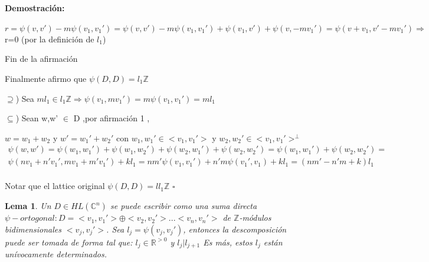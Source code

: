 \documentclass[12pt]{article}
\newtheorem{lemma}{Lema}
\newenvironment{proof}{\paragraph{Demostración:}}{\hfill$\square$}
\begin{document}
\begin{proof}
 $r= \psi(v,v') - m \psi(v_1,v_1')=\psi(v,v')-m\psi(v_1,v_1')+ \psi (v_1,v')+ \psi(v,-m v_1') 
 = \psi(v+v_1,v'-mv_1') \Rightarrow $ r=0 (por la definición de $l_1$)
 
 Fin de la afirmación
 \newline
 
 Finalmente afirmo que $\psi(D,D)=l_1 \mathbb{Z}$ 
 
 $\supseteq$) Sea $m l_1 \in l_1 \mathbb{Z} \Rightarrow \psi(v_1,m v_1') = m \psi(v_1,v_1')= m l_1$
 
 $\subseteq$) Sean w,w' $\in$ D ,por afirmación 1 ,
 
 $w = w_1 +w_2$  y $w'=w_1' +w_2'$ con $w_1,w_1' \in <v_1,v_1'>$ y  $w_2,w_2' \in <v_1,v_1'>^\bot$ 
 $\begin{aligned}
 \psi(w,w')=\psi(w_1,w_1')+ \psi(w_1,w_2')+ \psi(w_2,w_1')+\psi(w_2,w_2')=\psi(w_1,w_1')+\psi(w_2,w_2')= \\
 \psi(n v_1+n' v_1',m v_1+m' v_1') + k l_1 = n m' \psi(v_1,v_1')+n' m \psi(v_1',v_1)+ k l_1 = (n m' - n'm+k)l_1\\
 \end{aligned}$
 \newline 
 
 Notar que el lattice original $\psi(D,D)= l l_1 \mathbb{Z} $
\end{proof}

\begin{lemma} \label{1.8}
 Un $D \in HL(\mathbb{C}^n)$ se puede escribir como una suma directa $\psi-ortogonal : D=<v_1,v_1'>\oplus<v_2,v_2'>...<v_n,v_n'>$
 de $\mathbb{Z}$-módulos bidimensionales $<v_j,v_j'>$. Sea $l_j=\psi(v_j,v_j')$, entonces la descomposición puede ser tomada 
 de forma tal que: $l_j \in \mathbb{R}^{>0}$ y $l_j | l_{j+1}$
 Es más, estos $l_j$ están unívocamente determinados.
\end{lemma}
\end{document}
